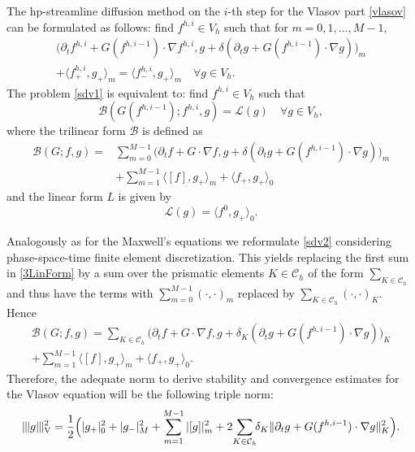 \documentclass[reqno,a4paper]{amsart}
\theoremstyle{remark}
\numberwithin{equation}{section}
\newcommand{\Vnorm}[1]{|\mkern-1mu|\mkern-1mu|#1|\mkern-1mu|\mkern-1mu|_\mathrm{V}}
\newcommand{\sprod}[2]{\langle #1, #2 \rangle}
\def\d{\partial}
\def\B{\mathcal{B}}
\def\L{\mathcal{L}}
\def\sumK{\sum_{K\in\mathcal{\tilde{C}}_h}\!\!}
\def\sumKV{\sum_{K\in\mathcal{C}_h}\!\!}
\begin{document}
The hp-streamline diffusion method on the $i$-th step
for the Vlasov part \eqref{vlasov} can be formulated as follows: 
find $f^{h,i}\in V_h$ such that for $m=0,1,\ldots,M-1$,
\begin{multline}\label{sdv1}
\Big(\d_t f^{h,i}+G(f^{h,i-1})\cdot\nabla f^{h,i},
g+\delta(\d_t g+G(f^{h,i-1})\cdot\nabla g)\Big)_m\\
+\sprod{f^{h,i}_+}{g_+}_m = \sprod{f^{h,i}_-}{g_+}_m \quad \forall g\in V_h.
\end{multline}
The problem \eqref{sdv1} is equivalent to: find $f^{h,i}\in V_h$ such that
\begin{equation}\label{sdv2}
\B(G(f^{h,i-1});f^{h,i},g) = \L(g) \quad \forall g\in V_h,
\end{equation}
where the trilinear form $\B$ is defined as
\begin{equation}\label{3LinForm}
\begin{split}
\B(G;f,g)
=&\sum_{m=0}^{M-1}\Big(\d_t f+G\cdot\nabla f,g
+\delta(\d_t g+G(f^{h,i-1})\cdot\nabla g)\Big)_m\\
&+\sum_{m=1}^{M-1}\sprod{[f]}{g_+}_m +\sprod{f_+}{g_+}_0
\end{split}
\end{equation}
and the linear form $L$ is given by
\[
\L(g)=\sprod{f^0}{g_+}_0.
\]

Analogously as for the Maxwell's equations we reformulate 
 \eqref{sdv2} considering phase-space-time finite element 
discretization. This yields replacing the first sum in \eqref{3LinForm} 
by a sum over 
the prismatic elements $K\in{\mathcal C}_h$ of the form 
$\sum_{K\in {\mathcal C}_h}$ and thus have 
the terms with  $\sum_{m=0}^{M-1} (\cdot,\cdot)_m$ replaced by 
$\sum_{K\in {\mathcal C}_h}(\cdot,\cdot)_K$. Hence  
\begin{multline*}
\B(G;f,g)
=
\sumKV\Big(\d_t f+G\cdot\nabla f,
g+\delta_K(\d_t g+G(f^{h,i-1})\cdot\nabla g)\Big)_K\\
+\sum_{m=1}^{M-1}\sprod{[f]}{g_+}_m +\sprod{f_+}{g_+}_0.
\end{multline*}
Therefore, the adequate norm to derive 
stability and convergence estimates for the Vlasov equation 
will be the following triple norm:
\[
\Vnorm{g}^2 =\frac{1}{2}\Big(|g_+|^2_0+|g_-|^2_M+\sum_{m=1}^{M-1}|[g]|^2_m
+2\!\sumKV\delta_K\|\d_t g+G(f^{h,i-1})\cdot\nabla g\|^2_K\Big).
\]
\end{document}
